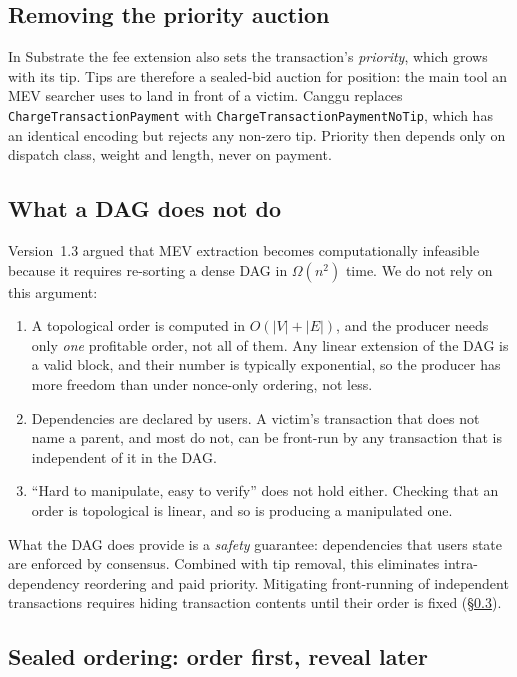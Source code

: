 \documentclass[11pt]{article}
\theoremstyle{definition}
\theoremstyle{remark}
\begin{document}
\subsection{Removing the priority auction}

In Substrate the fee extension also sets the transaction's \emph{priority}, which grows with its
tip. Tips are therefore a sealed-bid auction for position: the main tool an MEV searcher uses to
land in front of a victim. Canggu replaces \texttt{ChargeTransactionPayment} with
\texttt{ChargeTransactionPaymentNoTip}, which has an identical encoding but rejects any non-zero
tip. Priority then depends only on dispatch class, weight and length, never on payment.

\subsection{What a DAG does not do}
\label{sec:dag-limits}

Version~1.3 argued that MEV extraction becomes computationally infeasible because it requires
re-sorting a dense DAG in $\Omega(n^2)$ time. We do not rely on this argument:
\begin{enumerate}[leftmargin=*]
  \item A topological order is computed in $O(|V| + |E|)$, and the producer needs only \emph{one}
        profitable order, not all of them. Any linear extension of the DAG is a valid block, and
        their number is typically exponential, so the producer has more freedom than under
        nonce-only ordering, not less.
  \item Dependencies are declared by users. A victim's transaction that does not name a parent, and
        most do not, can be front-run by any transaction that is independent of it in the DAG.
  \item ``Hard to manipulate, easy to verify'' does not hold either. Checking that an order is
        topological is linear, and so is producing a manipulated one.
\end{enumerate}
What the DAG does provide is a \emph{safety} guarantee: dependencies that users state are enforced
by consensus. Combined with tip removal, this eliminates intra-dependency reordering and paid
priority. Mitigating front-running of independent transactions requires hiding transaction contents
until their order is fixed (\S\ref{sec:sealed}).

\subsection{Sealed ordering: order first, reveal later}
\label{sec:sealed}
\end{document}

